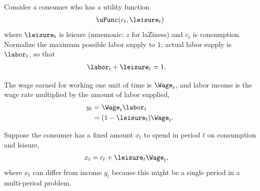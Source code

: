 
Consider a consumer who has a utility function
\begin{equation}\begin{gathered}\begin{aligned}
   \uFunc(c_{t},\leisure_{t})
\end{aligned}\end{gathered}\end{equation}
where $\leisure_{t}$ is leisure (mnemonic: $z$ for laZiness) and $c_{t}$ is
consumption.  Normalize the maximum possible labor supply
to $1$; actual labor supply is $\labor_{t}$, so
that
\begin{equation}\begin{gathered}\begin{aligned}
  \labor_{t} + \leisure_{t} & =  1.
\end{aligned}\end{gathered}\end{equation}

The wage earned for working one unit of time is $\Wage_{t}$, and labor
income is the wage rate multiplied by the amount of labor supplied,
\begin{equation}\begin{gathered}\begin{aligned}
  y_{t} & =  \Wage_{t}\labor_{t}
\\  & =  (1-\leisure_{t})\Wage_{t}.
\end{aligned}\end{gathered}\end{equation}

Suppose the consumer has a fixed amount $x_{t}$ to spend in period $t$ on consumption and leisure,
\begin{equation}\begin{gathered}\begin{aligned}
  \label{eq:xdef}
  x_{t} & =  c_{t}+\leisure_{t} \Wage_{t},
\end{aligned}\end{gathered}\end{equation}
where $x_{t}$ can differ from income $y_{t}$ because this might be a
single period in a multi-period problem.

